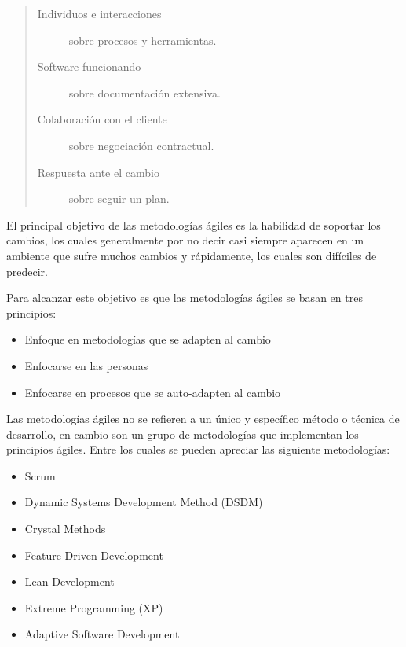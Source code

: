    \begin{quote}
     \begin{description}
       \item[Individuos e interacciones] sobre procesos y herramientas.
       \item[Software funcionando] sobre documentación extensiva.
       \item[Colaboración con el cliente] sobre negociación contractual.
       \item[Respuesta ante el cambio] sobre seguir un plan.
     \end{description}
   \end{quote}


   El principal objetivo de las metodologías ágiles es la habilidad de soportar los cambios, los cuales generalmente por no decir casi siempre aparecen en un ambiente que sufre muchos cambios y rápidamente, los cuales son difíciles de predecir.\cite{design2005}


   Para alcanzar este objetivo es que las metodologías ágiles se basan en tres principios: \cite{xpHutagalung}

\begin{itemize}
 \item Enfoque en metodologías que se adapten al cambio
 \item Enfocarse en las personas
 \item Enfocarse en procesos que se auto-adapten al cambio
\end{itemize}

   Las metodologías ágiles no se refieren a un único y específico método o técnica de desarrollo, en cambio son un grupo de metodologías que implementan los principios ágiles. Entre los cuales se pueden apreciar las siguiente metodologías:

   \begin{itemize}
     \item Scrum
     \item Dynamic Systems Development Method (DSDM)
     \item Crystal Methods
     \item Feature Driven Development
     \item Lean Development
     \item Extreme Programming (XP)
     \item Adaptive Software Development
   \end{itemize}


